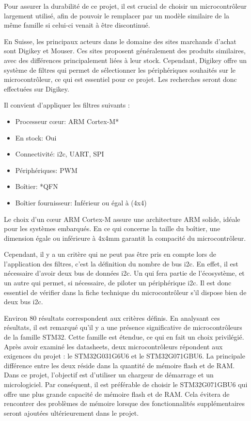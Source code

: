 Pour assurer la durabilité de ce projet, il est crucial de choisir un microcontrôleur largement utilisé, afin de pouvoir le remplacer par un modèle similaire de la même famille si celui-ci venait à être discontinué.

En Suisse, les principaux acteurs dans le domaine des sites marchands d'achat sont Digikey et Mouser.
Ces sites proposent généralement des produits similaires, avec des différences principalement liées à leur stock.
Cependant, Digikey offre un système de filtres qui permet de sélectionner les périphériques souhaités sur le microcontrôleur, ce qui est essentiel pour ce projet.
Les recherches seront donc effectuées sur Digikey.

Il convient d'appliquer les filtres suivants :

\begin{itemize}
    \item Processeur c\oe{}ur: ARM Cortex-M*
    \item En stock: Oui
    \item Connectivité: \gls{i2c}, UART, SPI
    \item Périphériques: PWM
    \item Boîtier: *QFN
    \item Boîtier fournisseur: Inférieur ou égal à (4x4)
\end{itemize}

Le choix d'un c\oe{}ur ARM Cortex-M assure une architecture ARM solide, idéale pour les systèmes embarqués.
En ce qui concerne la taille du boîtier, une dimension égale ou inférieure à 4x4mm garantit la compacité du microcontrôleur.

Cependant, il y a un critère qui ne peut pas être pris en compte lors de l'application des filtres, c'est la définition du nombre de bus \gls{i2c}.
En effet, il est nécessaire d'avoir deux bus de données \gls{i2c}.
Un qui fera partie de l'écosystème, et un autre qui permet, si nécessaire, de piloter un périphérique \gls{i2c}.
Il est donc essentiel de vérifier dans la fiche technique du microcontrôleur s'il dispose bien de deux bus \gls{i2c}.

Environ 80 résultats correspondent aux critères définis.
En analysant ces résultats, il est remarqué qu'il y a une présence significative de microcontrôleurs de la famille STM32.
Cette famille est étendue, ce qui en fait un choix privilégié.
Après avoir examiné les datasheets, deux microcontrôleurs répondent aux exigences du projet : le STM32G031G6U6 et le STM32G071GBU6.
La principale différence entre les deux réside dans la quantité de mémoire flash et de RAM.
Dans ce projet, l'objectif est d'utiliser un chargeur de démarrage et un micrologiciel.
Par conséquent, il est préférable de choisir le STM32G071GBU6 qui offre une plus grande capacité de mémoire flash et de RAM.
Cela évitera de rencontrer des problèmes de mémoire lorsque des fonctionnalités supplémentaires seront ajoutées ultérieurement dans le projet.

